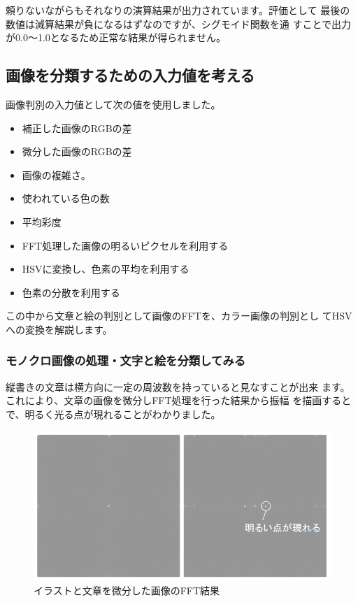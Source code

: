\documentclass[mingoth,a4paper]{jsarticle}
\begin{document}
頼りないながらもそれなりの演算結果が出力されています。評価として
最後の数値は減算結果が負になるはずなのですが、シグモイド関数を通
すことで出力が0.0〜1.0となるため正常な結果が得られません。

\subsection{画像を分類するための入力値を考える}

画像判別の入力値として次の値を使用しました。

\begin{itemize}
\item 補正した画像のRGBの差
\item 微分した画像のRGBの差
\item 画像の複雑さ。
\item 使われている色の数
\item 平均彩度
\item FFT処理した画像の明るいピクセルを利用する
\item HSVに変換し、色素の平均を利用する
\item 色素の分散を利用する
\end{itemize}

この中から文章と絵の判別として画像のFFTを、カラー画像の判別とし
てHSVへの変換を解説します。

\subsubsection{モノクロ画像の処理・文字と絵を分類してみる}

縦書きの文章は横方向に一定の周波数を持っていると見なすことが出来
ます。これにより、文章の画像を微分しFFT処理を行った結果から振幅
を描画するとで、明るく光る点が現れることがわかりました。

\begin{figure}[H]
\begin{center}
\includegraphics[width=0.9\hsize]{image201003/neuralnet04.png}
\caption{イラストと文章を微分した画像のFFT結果}
\end{center}
\end{figure}
\end{document}
